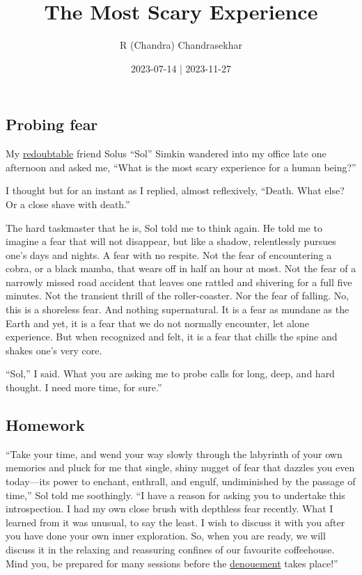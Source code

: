 \documentclass[
  a4paper,
]{article}
\title{The Most Scary Experience}
\author{R (Chandra) Chandrasekhar}
\date{2023-07-14 | 2023-11-27}
\begin{document}
\maketitle

\thispagestyle{empty}


\subsection{Probing fear}\label{probing-fear}

My \href{https://www.thefreedictionary.com/redoubtable}{redoubtable}
friend Solus ``Sol'' Simkin wandered into my office late one afternoon
and asked me, ``What is the most scary experience for a human being?''

I thought but for an instant as I replied, almost reflexively, ``Death.
What else? Or a close shave with death.''

The hard taskmaster that he is, Sol told me to think again. He told me
to imagine a fear that will not disappear, but like a shadow,
relentlessly pursues one's days and nights. A fear with no respite. Not
the fear of encountering a cobra, or a black mamba, that wears off in
half an hour at most. Not the fear of a narrowly missed road accident
that leaves one rattled and shivering for a full five minutes. Not the
transient thrill of the roller-coaster. Nor the fear of falling. No,
this is a shoreless fear. And nothing supernatural. It is a fear as
mundane as the Earth and yet, it is a fear that we do not normally
encounter, let alone experience. But when recognized and felt, it is a
fear that chills the spine and shakes one's very core.

``Sol,'' I said. What you are asking me to probe calls for long, deep,
and hard thought. I need more time, for sure.''

\subsection{Homework}\label{homework}

``Take your time, and wend your way slowly through the labyrinth of your
own memories and pluck for me that single, shiny nugget of fear that
dazzles you even today---its power to enchant, enthrall, and engulf,
undiminished by the passage of time,'' Sol told me soothingly. ``I have
a reason for asking you to undertake this introspection. I had my own
close brush with depthless fear recently. What I learned from it was
unusual, to say the least. I wish to discuss it with you after you have
done your own inner exploration. So, when you are ready, we will discuss
it in the relaxing and reassuring confines of our favourite coffeehouse.
Mind you, be prepared for many sessions before the
\href{https://www.thefreedictionary.com/denouement}{denouement} takes
place!''
\end{document}
